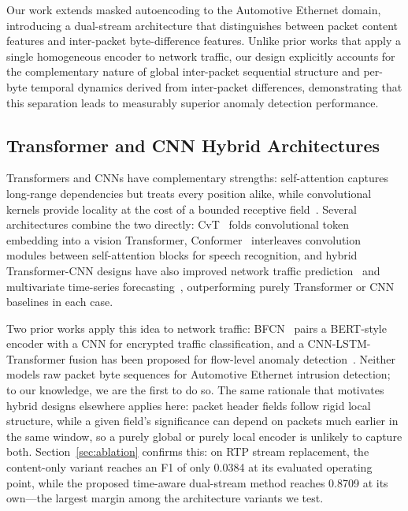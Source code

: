 Our work extends masked autoencoding to the Automotive Ethernet domain, introducing a dual-stream architecture that distinguishes between packet content features and inter-packet byte-difference features. Unlike prior works that apply a single homogeneous encoder to network traffic, our design explicitly accounts for the complementary nature of global inter-packet sequential structure and per-byte temporal dynamics derived from inter-packet differences, demonstrating that this separation leads to measurably superior anomaly detection performance.

\subsection{Transformer and CNN Hybrid Architectures}
Transformers and CNNs have complementary strengths: self-attention captures long-range dependencies but treats every position alike, while convolutional kernels provide locality at the cost of a bounded receptive field~\cite{vaswani2017attention, lecun1998gradient}. Several architectures combine the two directly: CvT~\cite{wu2021cvt} folds convolutional token embedding into a vision Transformer, Conformer~\cite{gulati2020conformer} interleaves convolution modules between self-attention blocks for speech recognition, and hybrid Transformer-CNN designs have also improved network traffic prediction~\cite{zhang2023novel} and multivariate time-series forecasting~\cite{el2025hybrid}, outperforming purely Transformer or CNN baselines in each case.

Two prior works apply this idea to network traffic: BFCN~\cite{shi2023bfcn} pairs a BERT-style encoder with a CNN for encrypted traffic classification, and a CNN-LSTM-Transformer fusion has been proposed for flow-level anomaly detection~\cite{wang2025self}. Neither models raw packet byte sequences for Automotive Ethernet intrusion detection; to our knowledge, we are the first to do so. The same rationale that motivates hybrid designs elsewhere applies here: packet header fields follow rigid local structure, while a given field's significance can depend on packets much earlier in the same window, so a purely global or purely local encoder is unlikely to capture both. Section~\ref{sec:ablation} confirms this: on RTP stream replacement, the content-only variant reaches an F1 of only 0.0384 at its evaluated operating point, while the proposed time-aware dual-stream method reaches 0.8709 at its own---the largest margin among the architecture variants we test.